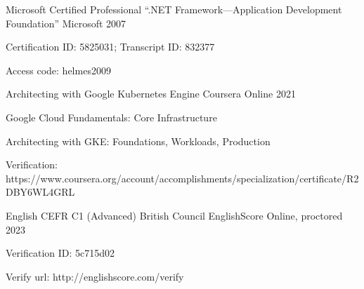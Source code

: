 

\begin{cventries}

  \cventry
    {Microsoft Certified Professional ``.NET Framework---Application Development Foundation''} %
    {Microsoft} %
    {} %
    {2007} %
    {
      \begin{cvitems} %
        \item {Certification ID: 5825031; Transcript ID: 832377}
        \item {Access code: helmes2009}
      \end{cvitems}
    }

  \cventry
    {Architecting with Google Kubernetes Engine} %
    {Coursera} %
    {Online} %
    {2021} %
    {
      \begin{cvitems} %
        \item {Google Cloud Fundamentals: Core Infrastructure}
        \item {Architecting with GKE: Foundations, Workloads, Production}
        \item {Verification: https://www.coursera.org/account/accomplishments/specialization/certificate/R2DBY6WL4GRL}
      \end{cvitems}
    }

  \cventry
    {English CEFR C1 (Advanced)} %
    {British Council EnglishScore} %
    {Online, proctored} %
    {2023} %
    {
      \begin{cvitems} %
       \item {Verification ID: 5c715d02}
       \item {Verify url: http://englishscore.com/verify}
      \end{cvitems}
    }

\end{cventries}
